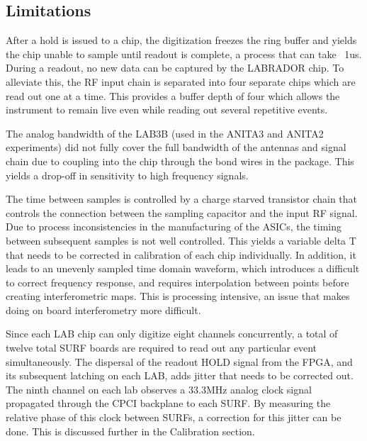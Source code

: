 	
	\subsection{Limitations}
	After a hold is issued to a chip, the digitization freezes the ring buffer and yields the chip unable to sample until readout is complete, a process that can take ~1us.  During a readout, no new data can be captured by the LABRADOR chip.  To alleviate this, the RF input chain is separated into four separate chips which are read out one at a time.  This provides a buffer depth of four which allows the instrument to remain live even while reading out several repetitive events.
	
	The analog bandwidth of the LAB3B (used in the ANITA3 and ANITA2 experiments) did not fully cover the full bandwidth of the antennas and signal chain due to coupling into the chip through the bond wires in the package.  This yields a drop-off in sensitivity to high frequency signals.  
	
	The time between samples is controlled by a charge starved transistor chain that controls the connection between the sampling capacitor and the input RF signal.  Due to process inconsistencies in the manufacturing of the ASICs, the timing between subsequent samples is not well controlled.  This yields a variable delta T that needs to be corrected in calibration of each chip individually.  In addition, it leads to an unevenly sampled time domain waveform, which introduces a difficult to correct frequency response, and requires interpolation between points before creating interferometric maps.  This is processing intensive, an issue that makes doing on board interferometry more difficult.
	
 	Since each LAB chip can only digitize eight channels concurrently, a total of twelve total SURF boards are required to read out any particular event simultaneously.  The dispersal of the readout HOLD signal from the FPGA, and its subsequent latching on each LAB, adds jitter that needs to be corrected out.  The ninth channel on each lab observes a 33.3MHz analog clock signal propagated through the CPCI backplane to each SURF.  By measuring the relative phase of this clock between SURFs, a correction for this jitter can be done.  This is discussed further in the Calibration section.
	
